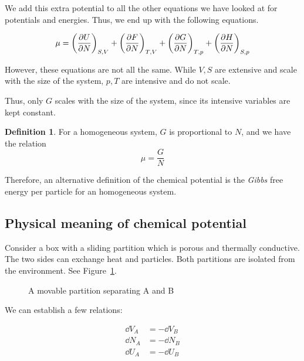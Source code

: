 \documentclass[12pt,chapterprefix=false,dvipsnames]{scrbook}
\theoremstyle{dotless}
\theoremstyle{definition}
\newtheorem{protodefinition}{Definition}[section]
\newenvironment{definition}
{\colorlet{shadecolor}{black!15}\begin{shaded}\begin{protodefinition}}
			{\end{protodefinition}\end{shaded}}
\begin{document}
We add this extra potential to all the other equations we have
looked at for potentials and energies. Thus, we end up with the
following equations.

\begin{equation}
	\mu
	=
	{\left(\pdv{U}{N}\right)}_{S,V} +
	{\left(\pdv{F}{N}\right)}_{T,V} +
	{\left(\pdv{G}{N}\right)}_{T,p}+
	{\left(\pdv{H}{N}\right)}_{S,p}
\end{equation}

However, these equations are not all the same. While
$V,S$ are extensive and scale with the size of
the system, $p,T$ are intensive and do not
scale.

Thus, only $G$ scales with the size of the
system, since its intensive variables are kept constant.

\begin{definition}
	For a homogeneous system, $G$ is proportional
	to $N$, and we have the relation
	\begin{equation}
		\mu
		=
		\frac{G}{N}
	\end{equation}
\end{definition}

Therefore, an alternative definition of the chemical potential
is the \textit{Gibbs} free energy per particle for an
homogeneous system.

\subsection{Physical meaning of chemical potential}%
\label{sub:physical_meaning_of_chemical_potential}

Consider a box with a sliding partition which is porous and
thermally conductive. The two sides can exchange heat and
particles. Both partitions are isolated from the environment.
See Figure~\ref{fig:chemical_potential_box}.

\begin{figure}[htpb]
	\centering
	
	\caption{A movable partition separating A and B}%
	\label{fig:chemical_potential_box}
\end{figure}

We can establish a few relations:

\begin{equation}
	\begin{aligned}
		\dd{V}_A & = -\dd{V}_B \\
		\dd{N}_A & = -\dd{N}_B \\
		\dd{U}_A & = -\dd{U}_B \\
	\end{aligned}
\end{equation}
\end{document}
